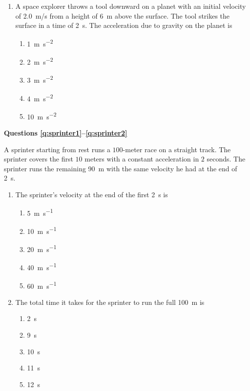 \documentclass{../../../oss-apphys}
\begin{document}
\begin{multicols}{2}
\begin{enumerate}[leftmargin=18pt]
  \item A space explorer throws a tool downward on a planet with an initial
    velocity of \SI{2.0}{m/s} from a height of \SI{6}{m} above the surface. The
    tool strikes the surface in a time of \SI{2}{\second}. The acceleration due
    to gravity on the planet is
    \begin{enumerate}[noitemsep,topsep=0pt,leftmargin=18pt,label=(\Alph*)]
    \item\SI{1 }{\metre\per\second^2}
    \item\SI{2 }{\metre\per\second^2}
    \item\SI{3 }{\metre\per\second^2}
    \item\SI{4 }{\metre\per\second^2}
    \item\SI{10}{\metre\per\second^2}
    \end{enumerate}
  \end{enumerate}
  \columnbreak

  \textbf{Questions \ref{q:sprinter1}--\ref{q:sprinter2}}
  
  A sprinter starting from rest runs a $100$-meter race on a straight track. The
  sprinter covers the first $10$ meters with a constant acceleration in $2$
  seconds. The sprinter runs the remaining \SI{90}{m} with the same velocity he
  had at the end of \SI{2}{\second}.

  \begin{enumerate}[resume,leftmargin=18pt]
  \item The sprinter's velocity at the end of the first \SI{2}{\second} is
    \begin{enumerate}[noitemsep,topsep=0pt,leftmargin=18pt,label=(\Alph*)]
    \item\SI{5 }{\metre\per\second}
    \item\SI{10}{\metre\per\second}
    \item\SI{20}{\metre\per\second}
    \item\SI{40}{\metre\per\second}
    \item\SI{60}{\metre\per\second}
    \end{enumerate}
    \label{q:sprinter1}

  \item The total time it takes for the sprinter to run the full \SI{100}{m} is
    \begin{enumerate}[noitemsep,topsep=0pt,leftmargin=18pt,label=(\Alph*)]
    \item\SI{2 }{\second}
    \item\SI{9 }{\second}
    \item\SI{10}{\second}
    \item\SI{11}{\second}
    \item\SI{12}{\second}
    \end{enumerate}
    \label{q:sprinter2}
    

\end{enumerate}
\end{multicols}
\end{document}
